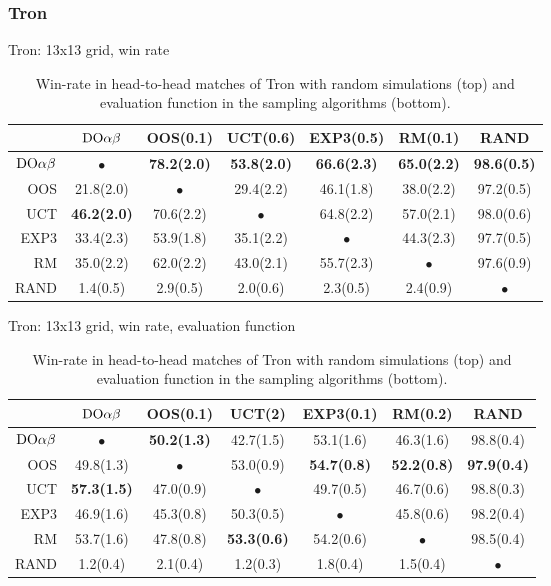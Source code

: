
\subsubsection{Tron}

\begin{table}[t!]
\centering
\begin{scriptsize}
Tron: 13x13 grid, win rate
\begin{tabular}{|r|cccccc|}\hline
&$\textrm{DO}\alpha\beta$&OOS(0.1)&UCT(0.6)&EXP3(0.5)&RM(0.1)&RAND\\\hline
$\textrm{DO}\alpha\beta$&$\bullet$&\textbf{78.2(2.0)}&\textbf{53.8(2.0)}&\textbf{66.6(2.3)}&\textbf{65.0(2.2)}&\textbf{98.6(0.5)}\\
OOS&21.8(2.0)&$\bullet$&29.4(2.2)&46.1(1.8)&38.0(2.2)&97.2(0.5)\\
UCT&\textbf{46.2(2.0)}&70.6(2.2)&$\bullet$&64.8(2.2)&57.0(2.1)&98.0(0.6)\\
EXP3&33.4(2.3)&53.9(1.8)&35.1(2.2)&$\bullet$&44.3(2.3)&97.7(0.5)\\
RM&35.0(2.2)&62.0(2.2)&43.0(2.1)&55.7(2.3)&$\bullet$&97.6(0.9)\\
RAND&1.4(0.5)&2.9(0.5)&2.0(0.6)&2.3(0.5)&2.4(0.9)&$\bullet$\\
\hline
\end{tabular}

Tron: 13x13 grid, win rate, evaluation function
\begin{tabular}{|r|cccccc|}\hline
&$\textrm{DO}\alpha\beta$&OOS(0.1)&UCT(2)&EXP3(0.1)&RM(0.2)&RAND\\\hline
$\textrm{DO}\alpha\beta$&$\bullet$&\textbf{50.2(1.3)}&42.7(1.5)&53.1(1.6)&46.3(1.6)&98.8(0.4)\\
OOS&49.8(1.3)&$\bullet$&53.0(0.9)&\textbf{54.7(0.8)}&\textbf{52.2(0.8)}&\textbf{97.9(0.4)}\\
UCT&\textbf{57.3(1.5)}&47.0(0.9)&$\bullet$&49.7(0.5)&46.7(0.6)&98.8(0.3)\\
EXP3&46.9(1.6)&45.3(0.8)&50.3(0.5)&$\bullet$&45.8(0.6)&98.2(0.4)\\
RM&53.7(1.6)&47.8(0.8)&\textbf{53.3(0.6)}&54.2(0.6)&$\bullet$&98.5(0.4)\\
RAND&1.2(0.4)&2.1(0.4)&1.2(0.3)&1.8(0.4)&1.5(0.4)&$\bullet$\\
\hline
\end{tabular}
\end{scriptsize}
\caption{Win-rate in head-to-head matches of Tron with random simulations (top) and evaluation function in the sampling algorithms (bottom).}\label{fig:matches:tron}
\end{table}

